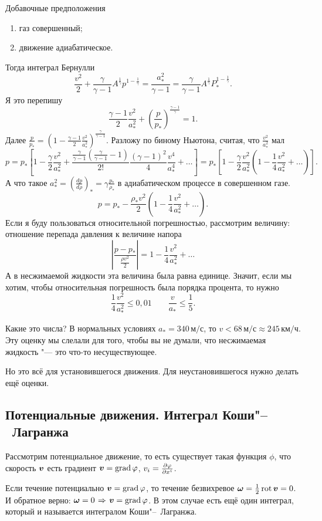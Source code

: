 Добавочные предположения
\begin{enumerate}
\item газ совершенный;
\item движение адиабатическое.
\end{enumerate}
Тогда интеграл Бернулли
\[
  \frac{v^2}2 + \frac{\gamma}{\gamma-1}A^{\frac1\gamma}p^{1-\frac1\gamma} = \frac{a_*^2}{\gamma-1} = \frac{\gamma}{\gamma-1}A^{\frac1\gamma}P_*^{1-\frac1\gamma}.
\]
Я это перепишу
\[
  \frac{\gamma-1}2\frac{v^2}{a_*^2}+\left(\frac p{p_*}\right)^{\frac{\gamma-1}\gamma}=1.
\]
Далее $\frac p{p_*} = \left(1-\frac{\gamma-1}2\frac{v^2}{a_*^2}\right)^{\frac\gamma{\gamma-1}}$. Разложу по биному Ньютона, считая, что $\frac{v^2}{a_*^2}$ мал
\[
  p=p_*\left[
	     1-\frac{\gamma}2\frac{v^2}{a_*^2}+\frac{\frac\gamma{\gamma-1}\left(\frac\gamma{\gamma-1}-1\right)}{2!}\frac{(\gamma-1)^2}{4}\frac{v^4}{a_*^4}+\dots
 	\right]
  =p_*\left[
	    1-\frac{\gamma}2\frac{v^2}{a_*^2}\left(1-\frac14\frac{v^2}{a_*^2}+\ldots\right)
	\right].
\]
А что такое $a_*^2 = \left(\frac{dp}{d\rho}\right)_* = \gamma\frac{p_*}{\rho_*}$ в адиабатическом процессе в совершенном газе.
\[
  p=p_* - \frac{\rho_*v^2}2\left(1-\frac14\frac{v^2}{a_*^2}+\dots\right).
\]
Если я буду пользоваться относительной погрешностью, рассмотрим величину: отношение перепада давления к величине напора
\[
  \left|
    \frac{p-p_*}{\frac{\rho v^2}2}
  \right| = 1 - \frac14 \frac{v^2}{a_*^2}+\dots
\]
А в несжимаемой жидкости эта величина была равна единице. Значит, если мы хотим, чтобы относительная погрешность была порядка процента, то нужно
\[
  \frac14\frac{v^2}{a_*^2}\le 0{,}01\qquad \frac v{a_*}\le\frac15.
\]

Какие это числа? В нормальных условиях $a_* = 340\,\text{м}/\text{с}$, то $v< 68\,\text{м}/\text{с}\approx 245\,\text{км}/\text{ч}$.
Эту оценку мы слелали для того, чтобы вы не думали, что несжимаемая жидкость "--- это что-то несуществующее.

Но это всё для установившегося движения. Для неустановившегося нужно делать ещё оценки.

\subsection{Потенциальные движения. Интеграл Коши"--~Лагранжа}
Рассмотрим потенциальное движение, то есть существует такая функция $\phi$, что скорость $\boldsymbol{v}$ есть градиент $\boldsymbol{v}= \operatorname{grad}\varphi$, $v_i = \frac{\partial \varphi}{\partial x^i}$.

Если течение потенциально $\boldsymbol{v}= \operatorname{grad} \varphi$, то течение безвихревое $\boldsymbol{\omega} = \frac12\operatorname{rot}\boldsymbol{v} = 0$. И обратное верно: $\ve\omega=0\imp \ve v= \grad\phi$. В этом случае есть ещё один интеграл, который и называется интегралом Коши"--~Лагранжа.

